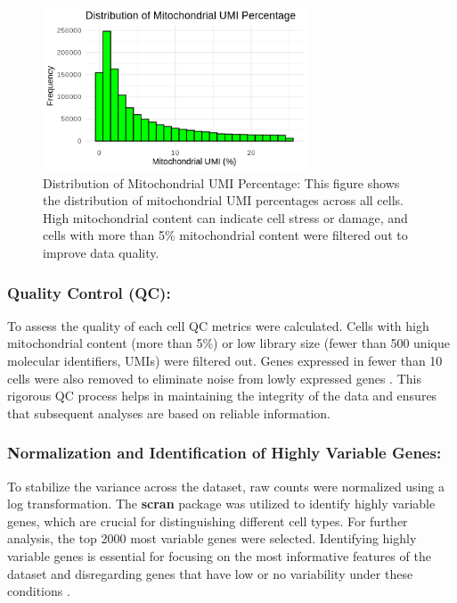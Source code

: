 \documentclass[runningheads]{llncs}
\begin{document}
\begin{figure}[H]
  \centering
  \includegraphics[height=0.2\textheight, width=0.7\textwidth]{000018.png}
  \caption{Distribution of Mitochondrial UMI Percentage: This figure shows the distribution of mitochondrial UMI percentages across all cells. High mitochondrial content can indicate cell stress or damage, and cells with more than 5\% mitochondrial content were filtered out to improve data quality.}
  \label{fig:mito_umi_percent}
\end{figure}

\subsubsection{Quality Control (QC):} To assess the quality of each cell QC metrics were calculated. Cells with high mitochondrial content (more than 5\%) or low library size (fewer than 500 unique molecular identifiers, UMIs) were filtered out. Genes expressed in fewer than 10 cells were also removed to eliminate noise from lowly expressed genes \cite{phipson2022propeller}. This rigorous QC process helps in maintaining the integrity of the data and ensures that subsequent analyses are based on reliable information.

\subsubsection{Normalization and Identification of Highly Variable Genes:} To stabilize the variance across the dataset, raw counts were normalized using a log transformation. The \textbf{scran} package was utilized to identify highly variable genes, which are crucial for distinguishing different cell types. For further analysis, the top 2000 most variable genes were selected. Identifying highly variable genes is essential for focusing on the most informative features of the dataset and disregarding genes that have low or no variability under these conditions \cite{stuart2019comprehensive}.
\end{document}
